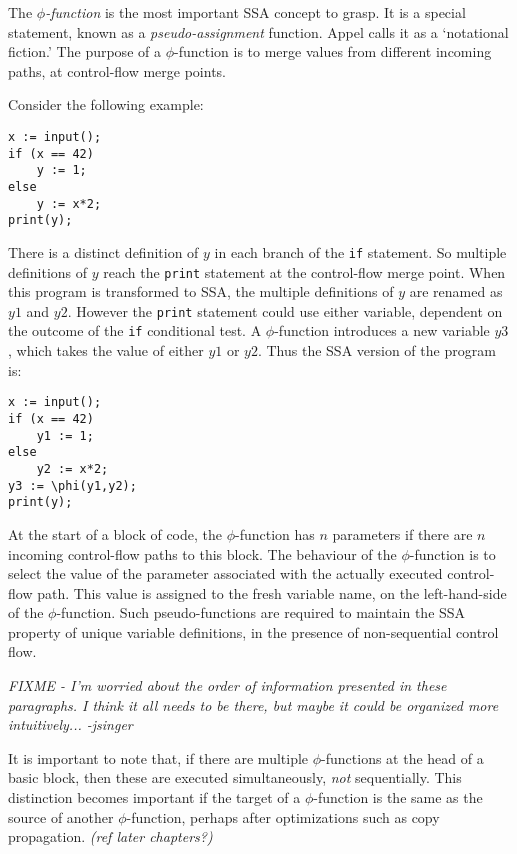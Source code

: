 The \textit{$\phi$-function} is the most important SSA concept to grasp.
It is a special statement, known as a
\textit{pseudo-assignment} function.
Appel \cite{appel97modern} calls it as a `notational fiction.'
The purpose of a $\phi$-function is to merge
values from different incoming paths, at control-flow
merge points.

Consider the following example:

\begin{verbatim}
x := input();
if (x == 42)
    y := 1;
else
    y := x*2;
print(y);
\end{verbatim}

There is a distinct definition of $y$ in each branch of the \texttt{if}
statement. So multiple definitions of $y$ reach the \texttt{print} statement
at the control-flow merge point. When this program is transformed to SSA,
the multiple definitions of $y$ are renamed as $y1$ and $y2$. However 
the \texttt{print} statement could use either variable, dependent on the
outcome of the \texttt{if} conditional test. A $\phi$-function introduces
a new variable $y3$, which takes the value of either $y1$ or $y2$.
Thus the SSA version of the program is:

\begin{verbatim}
x := input();
if (x == 42)
    y1 := 1;
else
    y2 := x*2;
y3 := \phi(y1,y2);
print(y);
\end{verbatim}



At the start of a block of code, the $\phi$-function has
$n$ parameters if there are $n$ incoming control-flow paths to this block.
The behaviour of the $\phi$-function is to select the value
of the parameter associated with the actually executed control-flow path.
This value is assigned to the fresh variable name, on the left-hand-side
of the $\phi$-function.
Such pseudo-functions are required to maintain the SSA property
of unique variable definitions,
in the presence of non-sequential control flow.

\textit{FIXME - I'm worried about the order of information
presented in these paragraphs. I think it all needs to be there,
but maybe it could be organized more intuitively... -jsinger}

It is important to note that, if there are multiple $\phi$-functions
at the head of a basic block, then these are executed simultaneously,
\textit{not} sequentially.
This distinction becomes important if the target of a $\phi$-function
is the same as the source of another $\phi$-function, perhaps after
optimizations such as copy propagation. \textit{(ref later chapters?)}

